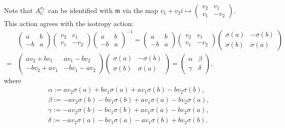 \documentclass[oneside,11pt]{amsart}
\theoremstyle{definition}
\theoremstyle{remark}
\numberwithin{thm}{section}
\numberwithin{equation}{section}
\begin{document}
Note that $A_\mathbb C^{\sigma_\mathbb C}$ can be identified with $\mathfrak m$ via the map $v_1+v_2i\mapsto \begin{pmatrix}
    v_2 & v_1 \\
    v_1 & -v_2
\end{pmatrix}$. This action agrees with the isotropy action:
\begin{align*}
& \begin{pmatrix}
    a & b \\
    -b & a
\end{pmatrix}\begin{pmatrix}
    v_2 & v_1 \\
    v_1 & -v_2
\end{pmatrix}\begin{pmatrix}
    a & b \\
    -b & a
\end{pmatrix}^{-1}=\begin{pmatrix}
    a & b \\
    -b & a
\end{pmatrix}\begin{pmatrix}
    v_2 & v_1 \\
    v_1 & -v_2
\end{pmatrix}\begin{pmatrix}
    \sigma(a) & -\sigma(b) \\
    \sigma(b) & \sigma(a)
\end{pmatrix}\\
= & \begin{pmatrix}
    av_2+bv_1 & av_1-bv_2 \\
    -bv_2+av_1 & -bv_1-av_2
\end{pmatrix}\begin{pmatrix}
    \sigma(a) & -\sigma(b) \\
    \sigma(b) & \sigma(a)
\end{pmatrix} = \begin{pmatrix} \alpha & \beta \\ \gamma & \delta \end{pmatrix},
\end{align*}
where 
\begin{align*}
& \alpha:= av_2\sigma(a)+bv_1\sigma(a)+av_1\sigma(b)-bv_2\sigma(b),\\ 
& \beta := -av_2\sigma(b)-bv_1\sigma(b)+av_1\sigma(a)-bv_2\sigma(a), \\
& \gamma:= -av_2\sigma(b)-bv_1\sigma(b)+av_1\sigma(a)-bv_2\sigma(a),\\
& \delta:= -av_2\sigma(a)-bv_1\sigma(a)-av_1\sigma(b)+bv_2\sigma(b).    
\end{align*}
\end{document}
